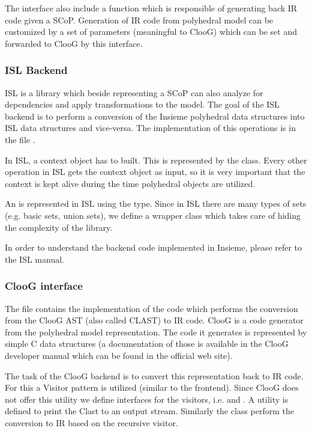 The  interface also include a  function which is
responsible of generating back IR code given a SCoP. Generation of IR code from
polyhedral model can be customized by a set of parameters (meaningful to ClooG)
which can be set and forwarded to ClooG by this interface.

\subsubsection{ISL Backend}

ISL is a library which beside representing a SCoP can also analyze for
dependencies and apply transformations to the model. The goal of the ISL backend
is to perform a conversion of the Insieme polyhedral data structures into ISL
data structures and vice-versa. The implementation of this operations is in the
file .

In ISL, a context object has to built. This is represented by the
 class. Every other operation in ISL gets the context object as
input, so it is very important that the context is kept alive during the time
polyhedral objects are utilized. 

An  is represented in ISL using the  type.
Since in ISL there are many types of sets (e.g. basic sets, union sets), we
define a wrapper class  which takes care of hiding the complexity
of the library. 

In order to understand the backend code implemented in Insieme, please refer to
the ISL manual. 

\subsubsection{ClooG interface}

The file  contains the
implementation of the code which performs the conversion from the ClooG AST
(also called CLAST) to IR code. ClooG is a code generator from the polyhedral
model representation. The code it generates is represented by simple C data
structures (a documentation of those is available in the ClooG developer manual
which can be found in the official web site). 

The task of the ClooG backend is to convert this representation back to IR code.
For this a Visitor pattern is utilized (similar to the frontend). Since ClooG
does not offer this utility we define interfaces for the visitors, i.e.
 and . A  utility is
defined to print the Clast to an output stream. Similarly the 
class perform the conversion to IR based on the recursive visitor. 

